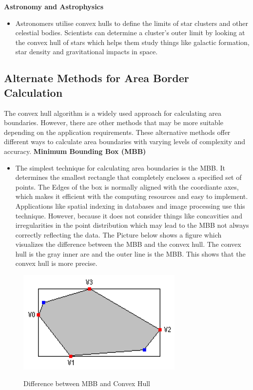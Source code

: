     \textbf{Astronomy and Astrophysics}
    \begin{itemize}
        \item Astronomers utilise convex hulls to define the limits of star clusters and other celestial bodies. Scientists can determine a cluster's outer limit by looking at the convex hull of stars which helps them study things like galactic formation, star density and gravitational impacts in space.
    \end{itemize}
    \autocite{Andi:irlApplication}

    \subsection{Alternate Methods for Area Border Calculation}
    The convex hull algorithm is a widely used approach for calculating area boundaries. However, there are other methods that may be more suitable depending on the application requirements. These alternative methods offer different ways to calculate area boundaries with varying levels of complexity and accuracy. \newline \newline
    \textbf{Minimum Bounding Box (MBB)}
    \begin{itemize}
        \item The simplest technique for calculating area boundaries is the MBB. It determines the smallest rectangle that completely encloses a specified set of points. The Edges of the box is normally aligned with the coordiante axes, which makes it efficient with the computing resources and easy to implement. Applications like spatial indexing in databases and image processing use this technique. However, because it does not consider things like concavities and irregularities in the point distribution which may lead to the MBB not always correctly reflecting the data. The Picture below shows a figure which visualizes the difference between the MBB and the convex hull. The convex hull is the gray inner are and the outer line is the MBB. This shows that the convex hull is more precise. \autocite{Andi:mbb}
    \end{itemize} 

    \begin{figure} [H]
        \centering
        \includegraphics [width=.55\textwidth] {images/andreas/areaBorders/mbb.png}
        \caption{Difference between MBB and Convex Hull}
        \cite{Andi:mbbPic}
    \end{figure}

